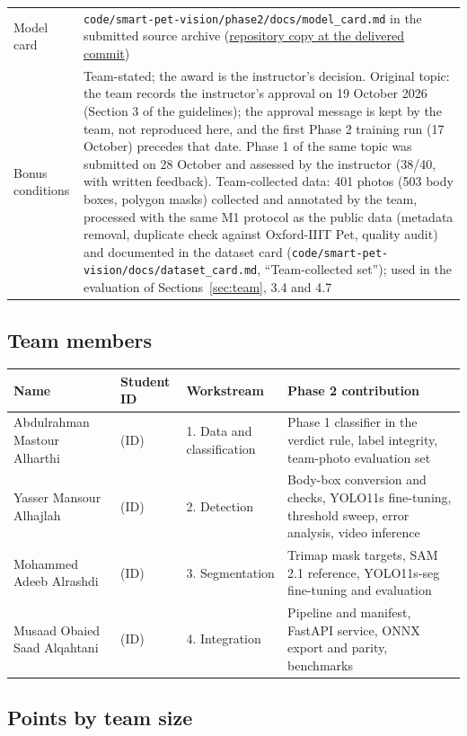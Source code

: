 \documentclass[11pt,a4paper]{article}
\newcommand{\idYasser}{(ID)}\newcommand{\idMohammed}{(ID)}%
\newcommand{\idMusaad}{(ID)}\newcommand{\idAbdulrahman}{(ID)}}
\newcommand{\deliverycommit}{(unbuilt working tree)}\newcommand{\deliverybranch}{(none)}}
\begin{document}
\begin{xltabular}{\linewidth}{@{}l Y@{}}
Model card & \texttt{code/smart-pet-vision/phase2/docs/model\_card.md} in the submitted source archive (\href{https://github.com/Yasser-20-alhajlah/smart-pet-vision/blob/\deliverycommit/smart-pet-vision/phase2/docs/model_card.md}{repository copy at the delivered commit}) \\
Bonus conditions & Team-stated; the award is the instructor's decision. Original topic: the team records the instructor's approval on 19 October 2026 (Section 3 of the guidelines); the approval message is kept by the team, not reproduced here, and the first Phase 2 training run (17 October) precedes that date. Phase 1 of the same topic was submitted on 28 October and assessed by the instructor (38/40, with written feedback). Team-collected data: 401 photos (503 body boxes, polygon masks) collected and annotated by the team, processed with the same M1 protocol as the public data (metadata removal, duplicate check against Oxford-IIIT Pet, quality audit) and documented in the dataset card (\texttt{code/smart-pet-vision/docs/dataset\_card.md}, ``Team-collected set''); used in the evaluation of Sections~\ref{sec:team}, 3.4 and 4.7 \\
\end{xltabular}

\subsection*{Team members}

\begin{tabularx}{\linewidth}{@{}l l l Y@{}}
\toprule
Name & Student ID & Workstream & Phase 2 contribution \\
\midrule
Abdulrahman Mastour Alharthi & \idAbdulrahman{} & 1. Data and classification & Phase 1 classifier in the verdict rule, label integrity, team-photo evaluation set \\
Yasser Mansour Alhajlah & \idYasser{} & 2. Detection & Body-box conversion and checks, YOLO11s fine-tuning, threshold sweep, error analysis, video inference \\
Mohammed Adeeb Alrashdi & \idMohammed{} & 3. Segmentation & Trimap mask targets, SAM 2.1 reference, YOLO11s-seg fine-tuning and evaluation \\
Musaad Obaied Saad Alqahtani & \idMusaad{} & 4. Integration & Pipeline and manifest, FastAPI service, ONNX export and parity, benchmarks \\
\bottomrule
\end{tabularx}

\subsection*{Points by team size}
\end{document}
